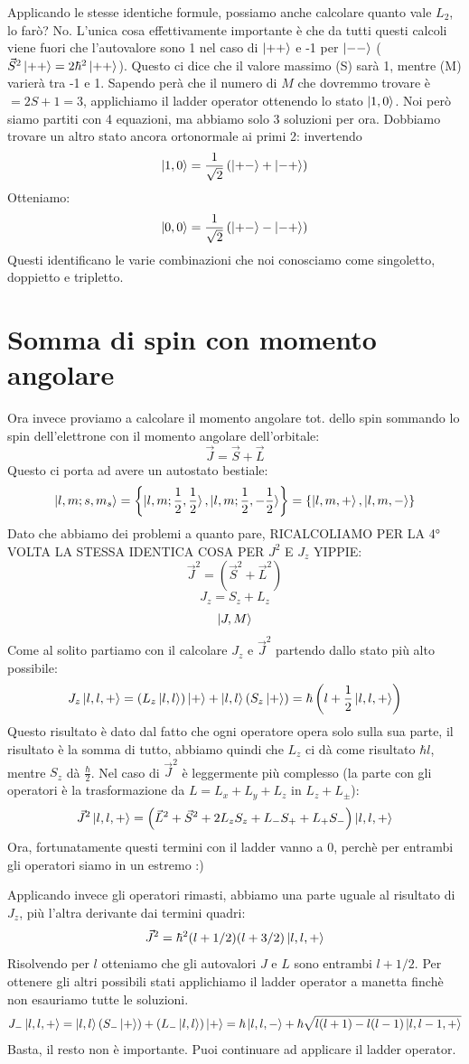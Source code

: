 Applicando le stesse identiche formule, possiamo anche calcolare quanto vale $L_2$, lo farò? No.
L'unica cosa effettivamente importante è che da tutti questi calcoli viene fuori che l'autovalore sono 1 nel caso di $\ket{++}$ e -1 per $\ket{--}$ ($\vec{S}^2 \ket{++} = 2\hbar^2\ket{++}$). Questo ci dice che il valore massimo (S) sarà 1, mentre (M) varierà tra -1 e 1. 
Sapendo perà che il numero di $M$ che dovremmo trovare è $= 2S + 1 = 3$, applichiamo il ladder operator ottenendo lo stato $\ket{1,0}$. Noi però siamo partiti con 4 equazioni, ma abbiamo solo 3 soluzioni per ora. Dobbiamo trovare un altro stato ancora ortonormale ai primi 2: invertendo 
$$\ket{1, 0} = \frac{1}{\sqrt{2}}\left(\ket{+-} + \ket{-+}\right)$$
Otteniamo:
$$\ket{0, 0} = \frac{1}{\sqrt{2}}\left(\ket{+-} - \ket{-+}\right)$$
Questi identificano le varie combinazioni che noi conosciamo come singoletto, doppietto e tripletto.

\section{Somma di spin con momento angolare}

Ora invece proviamo a calcolare il momento angolare tot. dello spin sommando lo spin dell'elettrone con il momento angolare dell'orbitale:
$$\vec{J} = \vec{S} + \vec{L}$$
Questo ci porta ad avere un autostato bestiale:
$$\ket{l,m;s,m_s} = \left\{\ket{l,m;\frac{1}{2},\frac{1}{2}}, \ket{l,m;\frac{1}{2},-\frac{1}{2}}\right\} = \left\{\ket{l,m,+}, \ket{l, m, -}\right\}$$
Dato che abbiamo dei problemi a quanto pare, RICALCOLIAMO PER LA 4° VOLTA LA STESSA IDENTICA COSA PER $J^2$ E $J_z$ YIPPIE:
$$\vec{J}^2 = (\vec{S}^2 + \vec{L}^2)$$
$$J_z = S_z + L_z$$
$$\ket{J, M}$$
Come al solito partiamo con il calcolare $J_z$ e $\vec{J}^2$ partendo dallo stato più alto possibile:
$$J_z\ket{l,l,+} = \left(L_z \ket{l,l}\right)\ket{+} + \ket{l,l}(S_z\ket{+})=\hbar\left(l+\frac{1}{2}\ket{l,l,+}\right)$$
Questo risultato è dato dal fatto che ogni operatore opera solo sulla sua parte, il risultato è la somma di tutto, abbiamo quindi che $L_z$ ci dà come risultato $\hbar l$, mentre $S_z$ dà $\frac{\hbar}{2}$.
Nel caso di $\vec{J}^2$ è leggermente più complesso (la parte con gli operatori è la trasformazione da $L = L_x + L_y + L_z$ in $L_z + L_{\pm}$):
$$\vec{J}^2\ket{l,l,+} = \left(\vec{L}^2 + \vec{S}^2 + {2L_zS_z + L_-S_+ + L_+S_-}\right)\ket{l,l,+}$$
Ora, fortunatamente questi termini con il ladder vanno a 0, perchè per entrambi gli operatori siamo in un estremo :)

Applicando invece gli operatori rimasti, abbiamo una parte uguale al risultato di $J_z$, più l'altra derivante dai termini quadri:
$$\vec{J}^2 = \hbar^2(l+1/2)(l+3/2)\ket{l,l,+}$$
Risolvendo per $l$ otteniamo che gli autovalori $J$ e $L$ sono entrambi $l + 1/2$. Per ottenere gli altri possibili stati applichiamo il ladder operator a manetta finchè non esauriamo tutte le soluzioni.
$$J_-\ket{l,l,+} = \ket{l,l}\left(S_-\ket{+}\right) + \left(L_-\ket{l,l}\right)\ket{+} = \hbar\ket{l,l,-} + \hbar\sqrt{l(l+1) - l(l-1)  \ket{l,l-1,+}}$$
Basta, il resto non è importante. Puoi continuare ad applicare il ladder operator.

